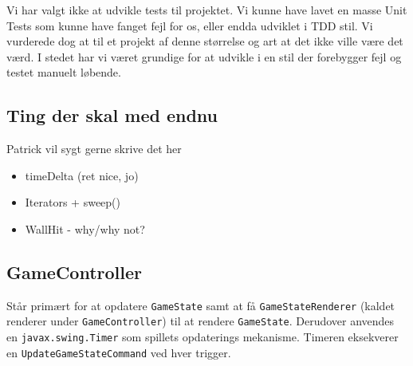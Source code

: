 \documentclass[titlepage,danish]{article}
\newcommand{\code}[1]{\texttt{#1}}
\begin{document}
Vi har valgt ikke at udvikle tests til projektet. Vi kunne have lavet en masse Unit Tests som kunne
have fanget fejl for os, eller endda udviklet i TDD stil. Vi vurderede dog at til et projekt af
denne størrelse og art at det ikke ville være det værd. I stedet har vi været grundige for at
udvikle i en stil der forebygger fejl og testet manuelt løbende.

\subsection{Ting der skal med endnu}
Patrick vil sygt gerne skrive det her
\begin{itemize}
\item timeDelta (ret nice, jo)
\item Iterators + sweep()
\item WallHit - why/why not?
\end{itemize}

\subsection{GameController}
Står primært for at opdatere \code{GameState} samt at få \code{GameStateRenderer} (kaldet renderer
under \code{GameController}) til at rendere \code{GameState}. Derudover anvendes en
\code{javax.swing.Timer} som spillets opdaterings mekanisme. Timeren eksekverer en
\code{UpdateGameStateCommand} ved hver trigger.
\end{document}
